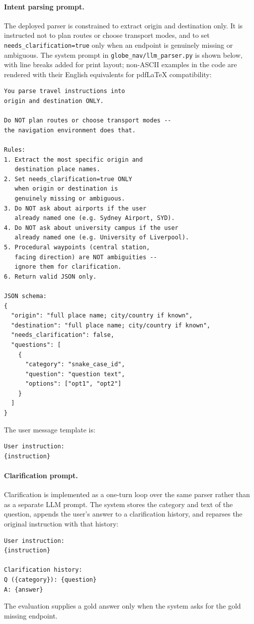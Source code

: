 \documentclass[11pt]{article}
\begin{document}
\paragraph{Intent parsing prompt.}
The deployed parser is constrained to extract origin and destination only. It is instructed not to plan routes or choose transport modes, and to set \texttt{needs\_clarification=true} only when an endpoint is genuinely missing or ambiguous. The system prompt in \texttt{globe\_nav/llm\_parser.py} is shown below, with line breaks added for print layout; non-ASCII examples in the code are rendered with their English equivalents for pdfLaTeX compatibility:
\begin{lstlisting}[style=promptstyle]
You parse travel instructions into
origin and destination ONLY.

Do NOT plan routes or choose transport modes --
the navigation environment does that.

Rules:
1. Extract the most specific origin and
   destination place names.
2. Set needs_clarification=true ONLY
   when origin or destination is
   genuinely missing or ambiguous.
3. Do NOT ask about airports if the user
   already named one (e.g. Sydney Airport, SYD).
4. Do NOT ask about university campus if the user
   already named one (e.g. University of Liverpool).
5. Procedural waypoints (central station,
   facing direction) are NOT ambiguities --
   ignore them for clarification.
6. Return valid JSON only.

JSON schema:
{
  "origin": "full place name; city/country if known",
  "destination": "full place name; city/country if known",
  "needs_clarification": false,
  "questions": [
    {
      "category": "snake_case_id",
      "question": "question text",
      "options": ["opt1", "opt2"]
    }
  ]
}
\end{lstlisting}
The user message template is:
\begin{lstlisting}[style=promptstyle]
User instruction:
{instruction}
\end{lstlisting}

\paragraph{Clarification prompt.}
Clarification is implemented as a one-turn loop over the same parser rather than as a separate LLM prompt. The system stores the category and text of the question, appends the user's answer to a clarification history, and reparses the original instruction with that history:
\begin{lstlisting}[style=promptstyle]
User instruction:
{instruction}

Clarification history:
Q ({category}): {question}
A: {answer}
\end{lstlisting}
The evaluation supplies a gold answer only when the system asks for the gold missing endpoint.
\end{document}
